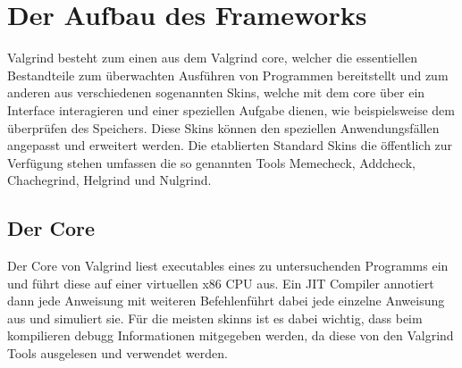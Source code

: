 \section{Der Aufbau des Frameworks}
Valgrind besteht zum einen aus dem Valgrind core, welcher die essentiellen Bestandteile zum überwachten Ausführen von Programmen bereitstellt und zum anderen aus verschiedenen sogenannten Skins, welche mit dem core über ein Interface interagieren und einer speziellen Aufgabe dienen, wie beispielsweise dem überprüfen des Speichers. Diese Skins können den speziellen Anwendungsfällen angepasst und erweitert werden. Die etablierten Standard Skins die öffentlich zur Verfügung stehen umfassen die so genannten Tools Memecheck, Addcheck, Chachegrind, Helgrind und Nulgrind.

\subsection{Der Core}
Der Core von Valgrind liest executables eines zu untersuchenden Programms ein und führt diese auf einer virtuellen x86 CPU aus. Ein JIT Compiler annotiert dann jede Anweisung mit weiteren Befehlenführt dabei jede einzelne Anweisung aus und simuliert sie. Für die meisten skinns ist es dabei wichtig, dass beim kompilieren debugg Informationen mitgegeben werden, da diese von den Valgrind Tools ausgelesen und verwendet werden.
